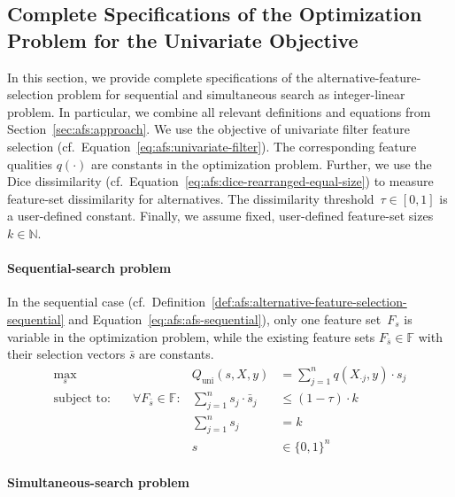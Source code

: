 \documentclass{article}
\theoremstyle{definition}
\begin{document}
\subsection{Complete Specifications of the Optimization Problem for the Univariate Objective}
\label{sec:afs:appendix:univariate-complete-optimization-problem}

In this section, we provide complete specifications of the alternative-feature-selection problem for sequential and simultaneous search as integer-linear problem.
In particular, we combine all relevant definitions and equations from Section~\ref{sec:afs:approach}.
We use the objective of univariate filter feature selection (cf.~Equation~\ref{eq:afs:univariate-filter}).
The corresponding feature qualities $q(\cdot)$ are constants in the optimization problem.
Further, we use the Dice dissimilarity (cf.~Equation~\ref{eq:afs:dice-rearranged-equal-size}) to measure feature-set dissimilarity for alternatives.
The dissimilarity threshold~$\tau \in [0,1]$ is a user-defined constant.
Finally, we assume fixed, user-defined feature-set sizes~$k \in \mathbb{N}$.

\paragraph{Sequential-search problem}

In the sequential case (cf.~Definition~\ref{def:afs:alternative-feature-selection-sequential} and Equation~\ref{eq:afs:afs-sequential}), only one feature set~$F_s$ is variable in the optimization problem, while the existing feature sets $F_{\bar{s}} \in \mathbb{F}$ with their selection vectors $\bar{s}$ are constants.
%
\begin{equation}
	\begin{aligned}
		\max_s &\quad & Q_{\text{uni}}(s,X,y) &= \sum_{j=1}^{n} q(X_{\cdot{}j},y) \cdot s_j \\
		\text{subject to:} &\quad \forall F_{\bar{s}} \in \mathbb{F}: & \sum_{j=1}^n s_j \cdot \bar{s}_j &\leq (1 - \tau) \cdot k \\
		&\quad & \sum_{j=1}^n s_j &= k \\
		&\quad & s &\in \{0,1\}^n
	\end{aligned}
	\label{eq:afs:afs-sequential-complete}
\end{equation}
%
\paragraph{Simultaneous-search problem}
\end{document}
